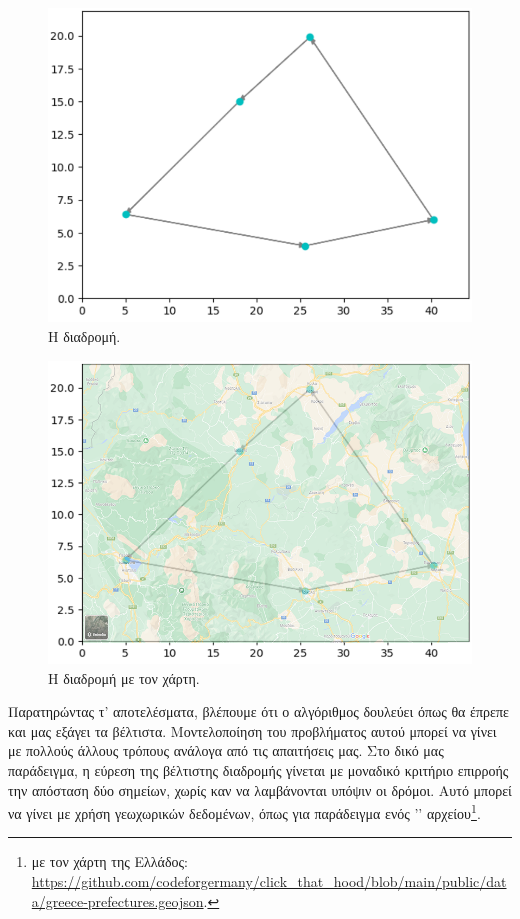 
\begin{figure}
    \centering
    \includegraphics[scale=0.60]{2947_thesis/pictures/route.png} 
    \caption{Η διαδρομή.}
    \label{route}
\end{figure}
\begin{figure}
    \centering
    \includegraphics[scale=0.60]{2947_thesis/pictures/route2.png} 
    \caption{Η διαδρομή με τον χάρτη.}
    \label{route2}
\end{figure}

Παρατηρώντας τ' αποτελέσματα, βλέπουμε ότι ο αλγόριθμος δουλεύει όπως θα έπρεπε και μας εξάγει τα βέλτιστα. Μοντελοποίηση του προβλήματος αυτού μπορεί να γίνει με πολλούς άλλους τρόπους ανάλογα από τις απαιτήσεις μας. Στο δικό μας παράδειγμα, η εύρεση της βέλτιστης διαδρομής γίνεται με μοναδικό κριτήριο επιρροής την απόσταση δύο σημείων, χωρίς καν να λαμβάνονται υπόψιν οι δρόμοι. Αυτό μπορεί να γίνει με χρήση γεωχωρικών δεδομένων, όπως για παράδειγμα ενός '' αρχείου\footnote{ με τον χάρτη της Ελλάδος: \url{https://github.com/codeforgermany/click_that_hood/blob/main/public/data/greece-prefectures.geojson}.}.

